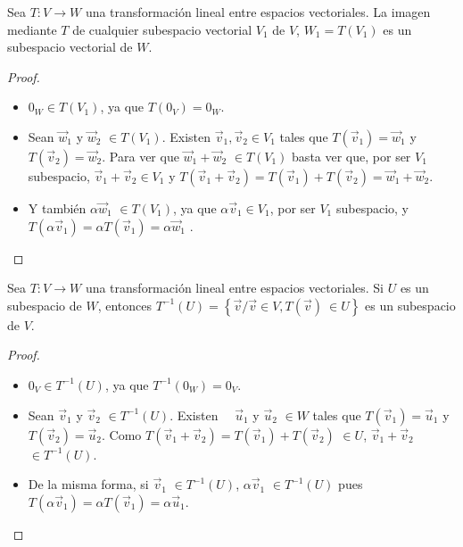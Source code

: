 \begin{theorem}
\label{Prop32}


Sea $T: V \rightarrow W$ una transformación lineal entre espacios vectoriales. La imagen mediante $T$ de cualquier subespacio vectorial $V_1$ de $V$, $W_1=T(V_1)$ es un subespacio vectorial de $W$.

\begin{proof}

\begin{itemize}

\item
$0_W  \in T(V_1)$, ya que $T(0_V)= 0_W$.

\item
Sean $\vec{w}_1$ y $\vec{w}_2$ $\in T(V_1)$. Existen  $ \vec{v}_1, \vec{v}_2  \in V_1$ tales que $T(\vec{v}_1)=\vec{w}_1$ y $T(\vec{v}_2)=\vec{w}_2$. Para ver que $\vec{w}_1 + \vec{w}_2$ $\in T(V_1)$ basta ver que,  por ser $V_1$ subespacio, $\vec{v}_1+ \vec{v}_2  \in V_1$  y $T(\vec{v}_1+ \vec{v}_2)=  T(\vec{v}_1)+T(\vec{v}_2)=\vec{w}_1 + \vec{w}_2$.

\item
Y también $\alpha\vec{w}_1$ $\in T(V_1)$, ya que $\alpha\vec{v}_1  \in V_1$, por ser $V_1$ subespacio, y  $T(\alpha   \vec{v}_1)=  \alpha T(\vec{v}_1)=\alpha \vec{w}_1$ .


\end{itemize}
\end{proof}
\end{theorem}


\bigskip

\bigskip


\begin{theorem}
\label{Prop33}




Sea $T: V \rightarrow W$ una transformación lineal entre espacios vectoriales. Si $U$ es un subespacio de $W$, entonces 
$T^{-1}(U)=\left\{\vec{v} /\vec{v} \in V, T(\vec{v})~ \in U \right\}$ es un subespacio de $V$.

\begin{proof}
\begin{itemize}

\item
$0_V  \in T^{-1}(U)$, ya que $T^{-1}(0_W)= 0_V$.


\item

Sean $\vec{v}_1$ y $\vec{v}_2$ $\in T^{-1}(U)$. Existen $ \quad \vec{u}_1$ y $\vec{u}_2$  $\in W$ tales que $T(\vec{v}_1)=\vec{u}_1$  y $T(\vec{v}_2)=\vec{u}_2$. Como $T(\vec{v}_1+\vec{v}_2)= T(\vec{v}_1)+T(\vec{v}_2)$ $\in U$, 
$\vec{v}_1+\vec{v}_2$ $\in T^{-1}(U)$.
\item

De  la misma forma,  si $ \vec{v}_1$ $\in T^{-1}(U)$, $\alpha \vec{v}_1$ $\in T^{-1}(U)$ pues $T( \alpha \vec{v}_1)=  \alpha T(\vec{v}_1)= \alpha  \vec{u}_1$. 

\end{itemize}

\end{proof}

\end{theorem}

